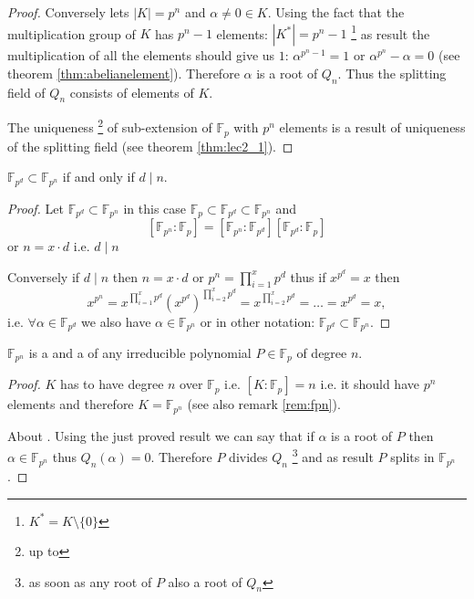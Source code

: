 \begin{theorem}
\begin{proof}
    Conversely lets $\left|K\right| = p^n$ and
    $\alpha \ne 0 \in K$.
    Using the fact that the multiplication group of $K$ has $p^n - 1$
    elements: $\left|K^*\right| = p^n - 1$
    \footnote{
      $K^* = K \setminus \{0\}$
    }
    as result the multiplication of all the elements should give us
    $1$: $\alpha^{p^n-1} = 1$ or $\alpha^{p^n} - \alpha = 0$
    (see theorem \ref{thm:abelianelement}).
    Therefore $\alpha$ is a root of $Q_n$. Thus the splitting field of
    $Q_n$ consists of elements of $K$.

    The uniqueness
    \footnote{
      up to 
    }
    of sub-extension of
    $\mathbb{F}_p$ with $p^n$ elements is a result of uniqueness of
    the splitting field (see theorem \ref{thm:lec2_1}). 
  \end{proof}
  \label{thm:lec3_1}
\end{theorem}

\begin{theorem}
  $\mathbb{F}_{p^d} \subset \mathbb{F}_{p^n}$ if and only if $d \mid n$. 
  \begin{proof}
    Let $\mathbb{F}_{p^d} \subset \mathbb{F}_{p^n}$ in this case
    $\mathbb{F}_p \subset \mathbb{F}_{p^d} \subset \mathbb{F}_{p^n}$
    and
    \[
    \left[\mathbb{F}_{p^n}:\mathbb{F}_{p}\right] =
    \left[\mathbb{F}_{p^n}:\mathbb{F}_{p^d}\right]
    \left[\mathbb{F}_{p^d}:\mathbb{F}_{p}\right]
    \]
    or $n = x \cdot d$ i.e. $d \mid n$

    Conversely if $d \mid n$ then $n = x \cdot d$ or
    $p^n = \prod^x_{i=1} p^d$ thus if $x^{p^d} = x$ then
    \[
    x^{p^n} = x^{\prod^x_{i=1} p^d}
    \left(x^{p^d}\right)^{\prod^x_{i=2} p^d} = x^{\prod^x_{i=2} p^d} =
    \dots = x^{p^d} = x,
    \]
    i.e. $\forall \alpha \in \mathbb{F}_{p^d}$ we also have
    $\alpha \in \mathbb{F}_{p^n}$ or in other notation:
    $\mathbb{F}_{p^d} \subset \mathbb{F}_{p^n}$.
  \end{proof}
  \label{thm:lec3_1_2}
\end{theorem}

\begin{theorem}
  $\mathbb{F}_{p^n}$ is a  and a
   of any irreducible polynomial
  $P \in \mathbb{F}_p$ of degree $n$.
  \begin{proof}
     $K$ has to have degree $n$ over
    $\mathbb{F}_p$ i.e.
    $\left[K:\mathbb{F}_p\right] = n$ i.e. it should have $p^n$
    elements and therefore $K=\mathbb{F}_{p^n}$
    (see also remark \ref{rem:fpn}).

    About . Using the just proved result
    we can say that if $\alpha$ is a root of $P$
    then $\alpha \in \mathbb{F}_{p^n}$ thus
    $Q_n\left(\alpha\right) = 0$. Therefore $P$ divides $Q_n$ 
    \footnote{as soon as any root of $P$ also a root of $Q_n$} and as
    result $P$ splits in $\mathbb{F}_{p^n}$.
  \end{proof}
  \label{thm:lec3_1_3}
\end{theorem}

